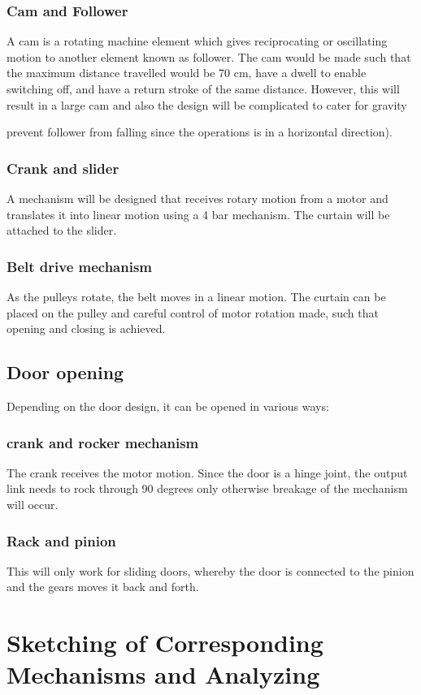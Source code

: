 \documentclass[oneside,notitlepage]{book}
\begin{document}
\subsubsection* {Cam and Follower}
A cam is a rotating machine element which gives reciprocating or oscillating motion to another element known as follower. The cam would be made such that the maximum distance travelled would be 70 cm, have a dwell to enable switching off, and have a return stroke of the same distance. However, this will result in a large cam and also the design will be complicated to cater for gravity {prevent follower from falling since the operations is in a horizontal direction).
\subsubsection* {Crank and slider}
A mechanism will be designed that receives rotary motion from a motor and translates it into linear motion using a 4 bar mechanism. The curtain will be attached to the slider.
\subsubsection* {Belt drive mechanism}
As the pulleys rotate, the belt moves in a linear motion. The curtain can be placed on the pulley and careful control of motor rotation made, such that opening and closing is achieved.

\subsection{Door opening}
Depending on the door design, it can be opened in various ways:

\subsubsection * {crank and rocker mechanism}
The crank receives the motor motion. Since the door is a hinge joint, the output link needs to rock through 90 degrees only otherwise breakage of the mechanism will occur.

\subsubsection* {Rack and pinion}
This will only work for sliding doors, whereby the door is connected to the pinion and the gears moves it back and forth.

\section{Sketching of Corresponding Mechanisms and Analyzing}
}
\end{document}
